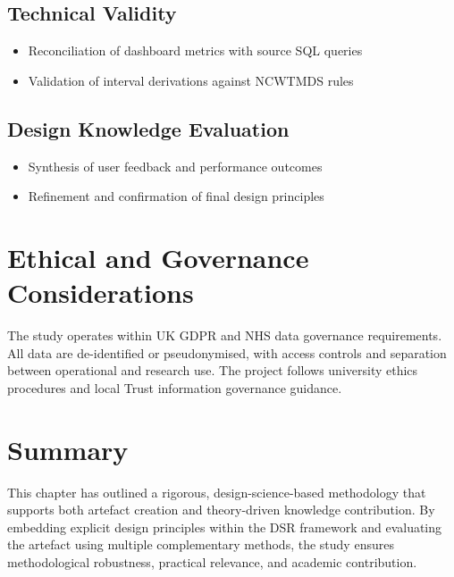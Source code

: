 \subsection{Technical Validity}
\begin{itemize}
    \item Reconciliation of dashboard metrics with source SQL queries
    \item Validation of interval derivations against NCWTMDS rules
\end{itemize}

\subsection{Design Knowledge Evaluation}
\begin{itemize}
    \item Synthesis of user feedback and performance outcomes
    \item Refinement and confirmation of final design principles
\end{itemize}

\section{Ethical and Governance Considerations}
The study operates within UK GDPR and NHS data governance requirements. All data are de-identified or pseudonymised, with access controls and separation between operational and research use. The project follows university ethics procedures and local Trust information governance guidance.

\section{Summary}
This chapter has outlined a rigorous, design-science-based methodology that supports both artefact creation and theory-driven knowledge contribution. By embedding explicit design principles within the DSR framework and evaluating the artefact using multiple complementary methods, the study ensures methodological robustness, practical relevance, and academic contribution.
